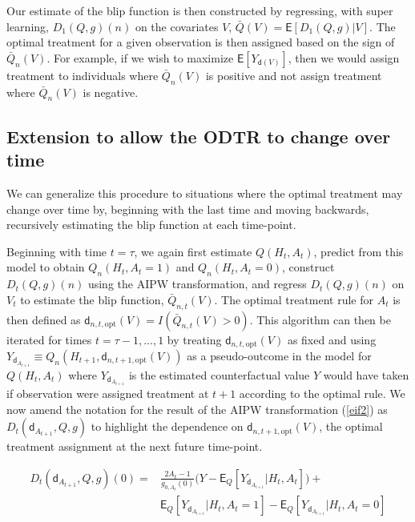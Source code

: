 \documentclass[11pt]{article}
\renewcommand{\d}{\mathsf{d}}
\newcommand{\E}{\mathsf{E}}
\begin{document}
Our estimate of the blip function is then constructed by regressing, with super learning, $D_1(Q, g)(n)$ on the covariates $V$, $\bar{Q}(V) = \E[D_1(Q, g) | V]$. The optimal treatment for a given observation is then assigned based on the sign of $\bar{Q}_n(V)$. For example, if we wish to maximize $\E [Y_{\d(V)}]$, then we would assign treatment to individuals where $\bar{Q}_n(V)$ is positive and not assign treatment where $\bar{Q}_n(V)$ is negative. 

\subsection{Extension to allow the ODTR to change over time}

We can generalize this procedure to situations where the optimal treatment may change over time by, beginning with the last time and moving backwards, recursively estimating the blip function at each time-point. 

Beginning with time $t = \tau$, we again first estimate $Q(H_t, A_t)$, predict from this model to obtain $Q_n(H_t, A_t = 1)$ and $Q_n(H_t, A_t = 0)$, construct $D_t(Q, g)(n)$ using the AIPW transformation, and regress $D_t(Q, g)(n)$ on $V_t$ to estimate the blip function, $\bar{Q}_{n,t}(V)$. The optimal treatment rule for $A_t$ is then defined as $\d_{n, t, \text{opt}}(V) = I(\bar{Q}_{n,t}(V) > 0)$. This algorithm can then be iterated for times $t = \tau - 1, ..., 1$ by treating $\d_{n, t, \text{opt}}(V)$ as fixed and using $Y_{\d_{A_{t+1}}} \equiv Q_n(H_{t+1}, \d_{n, t+1, \text{opt}}(V))$ as a pseudo-outcome in the model for $Q(H_t, A_t)$ where $Y_{\d_{A_{t+1}}}$ is the estimated counterfactual value $Y$ would have taken if observation were assigned treatment at $t + 1$ according to the optimal rule. We now amend the notation for the result of the AIPW transformation (\ref{eif2}) as $D_t(\d_{A_{t+1}}, Q, g)$ to highlight the dependence on $\d_{n,t+1, \text{opt}}(V)$, the optimal treatment assignment at the next future time-point.

\begin{equation}\label{eif2}
    \begin{split}
    D_t(\d_{A_{t+1}}, Q, g)(0) = &\frac{2A_t - 1}{g_{0, A_t}(0)}\Big(Y - \E_Q[Y_{\d_{A_{t+1}}}|H_t, A_t]\Big) + \\
    &\E_Q[Y_{\d_{A_{t+1}}}|H_t, A_t = 1] - \E_Q[Y_{\d_{A_{t+1}}}|H_t, A_t = 0]
\end{split}
\end{equation}
\end{document}
